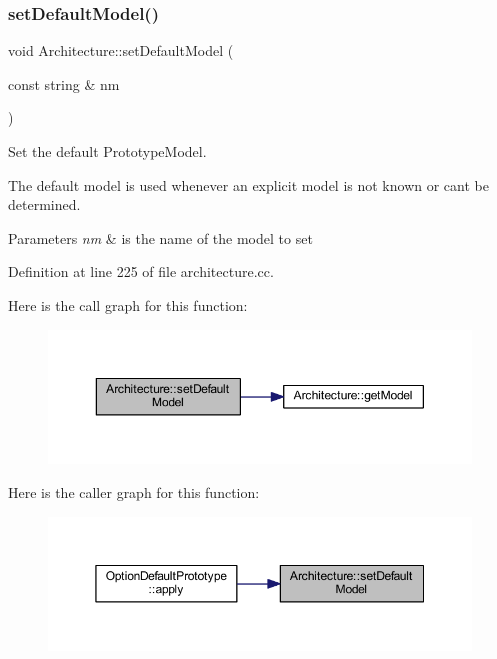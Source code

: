 \subsubsection{\texorpdfstring{setDefaultModel()}{setDefaultModel()}}
{\footnotesize\ttfamily void Architecture\+::set\+Default\+Model (\begin{DoxyParamCaption}\item[{const string \&}]{nm }\end{DoxyParamCaption})}



Set the default Prototype\+Model. 

The default model is used whenever an explicit model is not known or can\textquotesingle{}t be determined. 
\begin{DoxyParams}{Parameters}
{\em nm} & is the name of the model to set \\
\hline
\end{DoxyParams}


Definition at line 225 of file architecture.\+cc.

Here is the call graph for this function\+:
\nopagebreak
\begin{figure}[H]
\begin{center}
\leavevmode
\includegraphics[width=350pt]{class_architecture_afc351278b2e416181b2a7c5b65cc614b_cgraph}
\end{center}
\end{figure}
Here is the caller graph for this function\+:
\nopagebreak
\begin{figure}[H]
\begin{center}
\leavevmode
\includegraphics[width=350pt]{class_architecture_afc351278b2e416181b2a7c5b65cc614b_icgraph}
\end{center}
\end{figure}
\mbox{\label{class_architecture_ae002322a1fd364665099cbe3f98b63a6}} 
